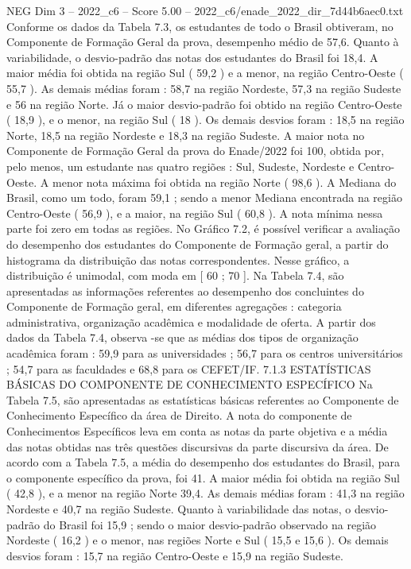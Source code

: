\begin{textsample}{NEG Dim 3 – 2022\_c6 – Score 5.00 – 2022\_c6/enade\_2022\_dir\_7d44b6aec0.txt}
Conforme os dados da Tabela 7.3, os estudantes de todo o Brasil obtiveram, no Componente de Formação Geral da prova, desempenho médio de 57,6.
Quanto à variabilidade, o desvio-padrão das notas dos estudantes do Brasil foi 18,4.
A maior média foi obtida na região Sul ( 59,2 ) e a menor, na região Centro-Oeste ( 55,7 ).
As demais médias foram : 58,7 na região Nordeste, 57,3 na região Sudeste e 56 na região Norte.
Já o maior desvio-padrão foi obtido na região Centro-Oeste ( 18,9 ), e o menor, na região Sul ( 18 ).
Os demais desvios foram : 18,5 na região Norte, 18,5 na região Nordeste e 18,3 na região Sudeste.
A maior nota no Componente de Formação Geral da prova do Enade/2022 foi 100, obtida por, pelo menos, um estudante nas quatro regiões : Sul, Sudeste, Nordeste e Centro-Oeste.
A menor nota máxima foi obtida na região Norte ( 98,6 ).
A Mediana do Brasil, como um todo, foram 59,1 ; sendo a menor Mediana encontrada na região Centro-Oeste ( 56,9 ), e a maior, na região Sul ( 60,8 ).
A nota mínima nessa parte foi zero em todas as regiões.
No Gráfico 7.2, é possível verificar a avaliação do desempenho dos estudantes do Componente de Formação geral, a partir do histograma da distribuição das notas correspondentes.
Nesse gráfico, a distribuição é unimodal, com moda em [ 60 ; 70 ].
Na Tabela 7.4, são apresentadas as informações referentes ao desempenho dos concluintes do Componente de Formação geral, em diferentes agregações : categoria administrativa, organização acadêmica e modalidade de oferta.
A partir dos dados da Tabela 7.4, observa -se que as médias dos tipos de organização acadêmica foram : 59,9 para as universidades ; 56,7 para os centros universitários ; 54,7 para as faculdades e 68,8 para os CEFET/IF. 7.1.3 ESTATÍSTICAS BÁSICAS DO COMPONENTE DE CONHECIMENTO ESPECÍFICO Na Tabela 7.5, são apresentadas as estatísticas básicas referentes ao Componente de Conhecimento Específico da área de Direito.
A nota do componente de Conhecimentos Específicos leva em conta as notas da parte objetiva e a média das notas obtidas nas três questões discursivas da parte discursiva da área.
De acordo com a Tabela 7.5, a média do desempenho dos estudantes do Brasil, para o componente específico da prova, foi 41.
A maior média foi obtida na região Sul ( 42,8 ), e a menor na região Norte 39,4.
As demais médias foram : 41,3 na região Nordeste e 40,7 na região Sudeste.
Quanto à variabilidade das notas, o desvio-padrão do Brasil foi 15,9 ; sendo o maior desvio-padrão observado na região Nordeste ( 16,2 ) e o menor, nas regiões Norte e Sul ( 15,5 e 15,6 ).
Os demais desvios foram : 15,7 na região Centro-Oeste e 15,9 na região Sudeste.

\end{textsample}
